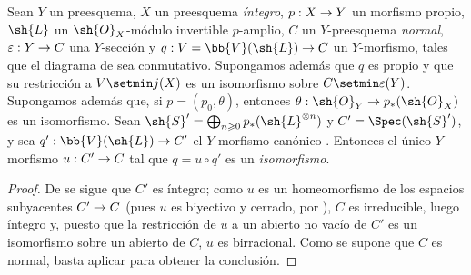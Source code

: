 \documentclass[oneside,10pt]{amsart}
\makeatletter
\renewcommand{\geq}{\geqslant}
\newcommand{\ega@arrow}[2]{\mathchoice{#1}{#2}{#2}{#2}}
\renewcommand{\to}{\ega@arrow{\longrightarrow}{\rightarrow}}
\let\EGAOriginalLabel\label
\renewcommand{\label}[1]{\phantomsection\EGAOriginalLabel{#1}}
\makeatother
\begin{document}
\begin{proposition}[8.11.7]
\label{II.8.11.7}
Sean $Y$ un preesquema, $X$ un preesquema \emph{íntegro}, $p:X\to Y$ un morfismo propio, $\sh{L}$ un $\sh{O}_X$-módulo invertible $p$-amplio, $C$ un $Y$-preesquema \emph{normal}, $\varepsilon:Y\to C$ una $Y$-sección y $q:V=\bb{V}(\sh{L})\to C$ un $Y$-morfismo, tales que el diagrama de  sea conmutativo.
Supongamos además que $q$ es propio y que su restricción a $V\setmin j(X)$ es un isomorfismo sobre $C\setmin\varepsilon(Y)$.
Supongamos además que, si $p=(p_0,\theta)$, entonces $\theta:\sh{O}_Y\to p_*(\sh{O}_X)$ es un isomorfismo.
Sean $\sh{S}'=\bigoplus_{n\geq0}p_*(\sh{L}^{\otimes n})$ y $C'=\Spec(\sh{S}')$, \textup{y} sea $q':\bb{V}(\sh{L})\to C'$ el $Y$-morfismo canónico .
Entonces el único $Y$-morfismo $u:C'\to C$ tal que $q=u\circ q'$ es un \emph{isomorfismo}.
\end{proposition}

\begin{proof}
De  se sigue que $C'$ es íntegro;
como $u$ es un homeomorfismo de los espacios subyacentes $C'\to C$ (pues $u$ es biyectivo y cerrado, por ), $C$ es irreducible, luego íntegro y, puesto que la restricción de $u$ a un abierto no vacío de $C'$ es un isomorfismo sobre un abierto de $C$, $u$ es birracional.
Como se supone que $C$ es normal, basta aplicar  para obtener la conclusión.
\end{proof}
\end{document}
